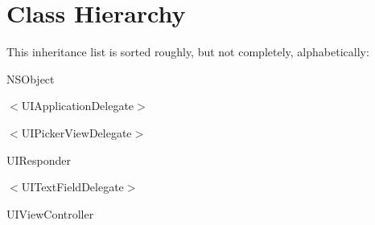 \section{Class Hierarchy}
This inheritance list is sorted roughly, but not completely, alphabetically\+:\begin{DoxyCompactList}
\item {}
\item N\+S\+Object\begin{DoxyCompactList}
\item {}
\end{DoxyCompactList}
\item $<$U\+I\+Application\+Delegate$>$\begin{DoxyCompactList}
\item {}
\end{DoxyCompactList}
\item $<$U\+I\+Picker\+View\+Delegate$>$\begin{DoxyCompactList}
\item {}
\end{DoxyCompactList}
\item U\+I\+Responder\begin{DoxyCompactList}
\item {}
\end{DoxyCompactList}
\item $<$U\+I\+Text\+Field\+Delegate$>$\begin{DoxyCompactList}
\item {}
\end{DoxyCompactList}
\item U\+I\+View\+Controller\begin{DoxyCompactList}
\item {}
\end{DoxyCompactList}
\item {}
\end{DoxyCompactList}

